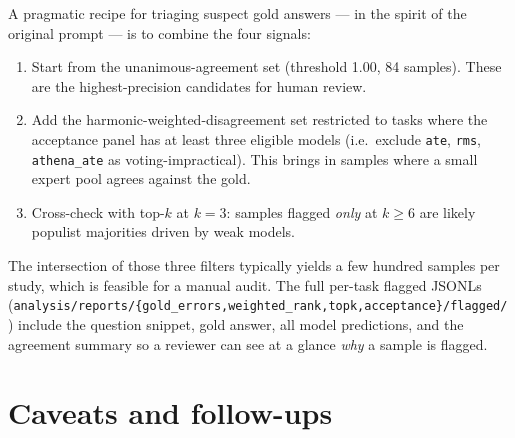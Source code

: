 \documentclass[10pt,a4paper]{article}
\begin{document}
A pragmatic recipe for triaging suspect gold answers --- in the spirit of the original prompt --- is to combine the four signals:

\begin{enumerate}
\item Start from the unanimous-agreement set (threshold 1.00, 84 samples). These are the highest-precision candidates for human review.
\item Add the harmonic-weighted-disagreement set restricted to tasks where the acceptance panel has at least three eligible models (i.e.\ exclude \texttt{ate}, \texttt{rms}, \texttt{athena\_ate} as voting-impractical). This brings in samples where a small expert pool agrees against the gold.
\item Cross-check with top-$k$ at $k{=}3$: samples flagged \emph{only} at $k\geq 6$ are likely populist majorities driven by weak models.
\end{enumerate}

The intersection of those three filters typically yields a few hundred samples per study, which is feasible for a manual audit. The full per-task flagged JSONLs (\texttt{analysis/reports/\{gold\_errors,weighted\_rank,topk,acceptance\}/flagged/}) include the question snippet, gold answer, all model predictions, and the agreement summary so a reviewer can see at a glance \emph{why} a sample is flagged.

\section{Caveats and follow-ups}
\end{document}
